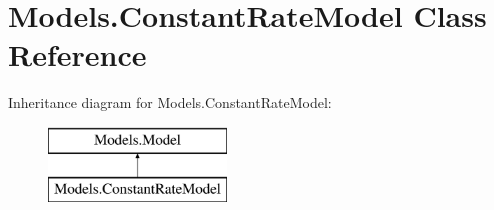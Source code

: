 \hypertarget{classModels_1_1ConstantRateModel}{\section{\-Models.\-Constant\-Rate\-Model \-Class \-Reference}
\label{classModels_1_1ConstantRateModel}
}
\-Inheritance diagram for \-Models.\-Constant\-Rate\-Model\-:\begin{figure}[H]
\begin{center}
\leavevmode
\includegraphics[height=2.000000cm]{classModels_1_1ConstantRateModel}
\end{center}
\end{figure}
